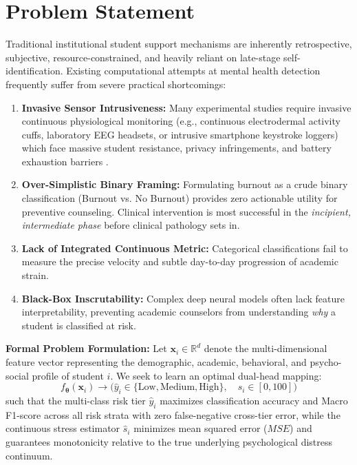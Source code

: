 \documentclass[12pt,a4paper,oneside]{report}
\begin{document}
\section{Problem Statement}
\label{sec:problem_statement}
Traditional institutional student support mechanisms are inherently retrospective, subjective, resource-constrained, and heavily reliant on late-stage self-identification. Existing computational attempts at mental health detection frequently suffer from severe practical shortcomings:
\begin{enumerate}
    \item \textbf{Invasive Sensor Intrusiveness:} Many experimental studies require invasive continuous physiological monitoring (e.g., continuous electrodermal activity cuffs, laboratory EEG headsets, or intrusive smartphone keystroke loggers) which face massive student resistance, privacy infringements, and battery exhaustion barriers \cite{sano2018}.
    \item \textbf{Over-Simplistic Binary Framing:} Formulating burnout as a crude binary classification (Burnout vs. No Burnout) provides zero actionable utility for preventive counseling. Clinical intervention is most successful in the \emph{incipient, intermediate phase} before clinical pathology sets in.
    \item \textbf{Lack of Integrated Continuous Metric:} Categorical classifications fail to measure the precise velocity and subtle day-to-day progression of academic strain.
    \item \textbf{Black-Box Inscrutability:} Complex deep neural models often lack feature interpretability, preventing academic counselors from understanding \emph{why} a student is classified at risk.
\end{enumerate}

\noindent
\textbf{Formal Problem Formulation:} Let $\mathbf{x}_i \in \mathbb{R}^d$ denote the multi-dimensional feature vector representing the demographic, academic, behavioral, and psycho-social profile of student $i$. We seek to learn an optimal dual-head mapping:
\begin{equation}
    f_{\boldsymbol{\theta}}(\mathbf{x}_i) \longrightarrow \Big( \hat{y}_i \in \{ \text{Low}, \text{Medium}, \text{High} \}, \quad \hat{s}_i \in [0, 100] \Big)
    \label{eq:dual_mapping}
\end{equation}
such that the multi-class risk tier $\hat{y}_i$ maximizes classification accuracy and Macro F1-score across all risk strata with zero false-negative cross-tier error, while the continuous stress estimator $\hat{s}_i$ minimizes mean squared error ($MSE$) and guarantees monotonicity relative to the true underlying psychological distress continuum.
\end{document}
